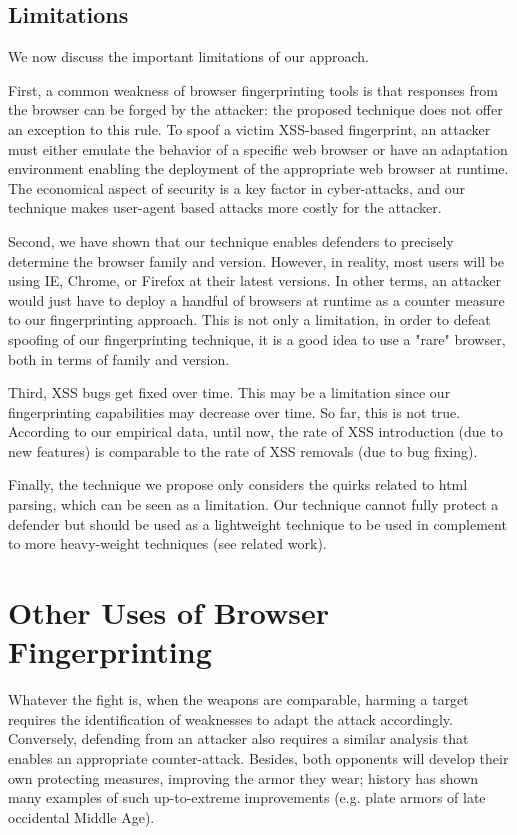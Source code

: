 \documentclass[10pt]{IEEEtran}
\begin{document}
\subsection{Limitations}
\label{sec:limitations}
We now discuss the important limitations of our approach.




First, a  common weakness of browser fingerprinting tools is that responses
from the browser can be forged by the attacker: the proposed technique does not offer 
an exception to this rule. 
To spoof a victim XSS-based fingerprint, an attacker must
 either emulate the behavior of a specific web browser or have an  adaptation environment enabling the deployment of the appropriate web browser at runtime.
The economical aspect of security is a key factor in cyber-attacks, and our technique makes user-agent based attacks more costly for the attacker. 




Second, we have shown that our technique enables defenders to precisely determine the browser family and version.
However, in reality, most users will be using IE, Chrome, or Firefox at their latest versions. 
In other terms, an attacker would just have to deploy a handful of browsers at runtime as a counter measure to our fingerprinting approach.
This is not only a limitation, in order to defeat spoofing of our fingerprinting technique,  it is a good idea to use a "rare" browser, both in terms of family and version.




Third, XSS bugs get fixed over time. This may be a limitation since our fingerprinting capabilities may decrease over time. So far, this is not true.
According to our empirical data, until now, the rate of XSS introduction (due to new features) is comparable to the rate of XSS removals (due to bug fixing).




Finally, the technique we propose only considers the quirks related to html parsing, which can be seen as a limitation. Our technique cannot fully protect a defender but 
should  be used as a lightweight technique to be used in complement to more heavy-weight techniques (see related work). 




\section{Other Uses of Browser Fingerprinting}
\label{sec:other-uses}
Whatever the fight is, when the weapons are comparable, harming a target 
requires the identification of weaknesses to adapt the attack accordingly. 
Conversely, defending from an attacker also requires a similar analysis that 
enables an appropriate counter-attack. Besides, both opponents will develop 
their own protecting measures, improving the armor they wear; history has 
shown many examples of such up-to-extreme improvements (e.g. plate armors 
of late occidental Middle Age). 
\end{document}
